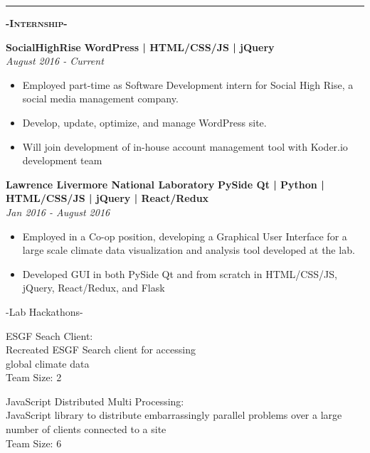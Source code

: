 \documentclass[12pt]{article}
\begin{document}
\noindent\rule{19cm}{0.4pt}

\center
\color{black}
\color{black}
\begin{center}
\textbf{\textsc{-Internship-}}\\
\end{center}
\begin{footnotesize}
\flushleft
\color{Cerulean}\textbf{SocialHighRise}\hfill \color{TealBlue} \textbf{WordPress | HTML/CSS/JS | jQuery} \\ \hfill\color{Black}\textit{August 2016 - Current}
\color{black}
\begin{itemize}
    \setlength{\itemsep}{0pt}
	\item Employed part-time as Software Development intern for Social High Rise, a social media management company.
	\item Develop, update, optimize, and manage WordPress site.
	\item Will join development of in-house account management tool with Koder.io development team
\end{itemize}
\color{Cerulean}\textbf{Lawrence Livermore National Laboratory} \color{Black} \hfill
\color{TealBlue} \textbf{PySide Qt | Python | HTML/CSS/JS | jQuery | React/Redux}\\
\color{Black} \hfill\textit{Jan 2016 - August 2016} 
\color{Black}
\begin{itemize}
    \setlength{\itemsep}{0pt}
	\item Employed in a Co-op position, developing a Graphical User Interface for a large scale climate data visualization and analysis tool developed at the lab.
	\item Developed GUI in both PySide Qt and from scratch in HTML/CSS/JS, jQuery, React/Redux, and Flask
\
\end{itemize}

\center
-Lab Hackathons-
\begin{multicols}{2}
\center
\color{Cerulean}ESGF Seach Client:\\ \color{black}
Recreated ESGF Search client for accessing\\
global climate data\\
Team Size: 2

\columnbreak

\color{Cerulean}JavaScript Distributed Multi Processing:\\ \color{black}
JavaScript library to distribute embarrassingly parallel problems over a large number of clients connected to a site\\
Team Size: 6


\end{multicols}
\medskip

\end{footnotesize}
\end{document}
